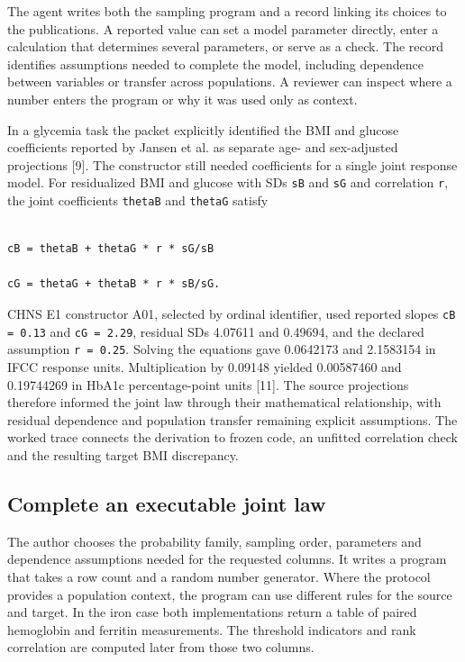 \documentclass[sigconf,review]{acmart}
\begin{document}
The agent writes both the sampling program and a record linking its choices to the publications. A reported value can set a model parameter directly, enter a calculation that determines several parameters, or serve as a check. The record identifies assumptions needed to complete the model, including dependence between variables or transfer across populations. A reviewer can inspect where a number enters the program or why it was used only as context.


In a glycemia task the packet explicitly identified the BMI and glucose coefficients reported by Jansen et al. as separate age- and sex-adjusted projections [9]. The constructor still needed coefficients for a single joint response model. For residualized BMI and glucose with SDs \texttt{sB} and \texttt{sG} and correlation \texttt{r}, the joint coefficients \texttt{thetaB} and \texttt{thetaG} satisfy


\noindent\begin{minipage}{\columnwidth}

\begin{lstlisting}

cB = thetaB + thetaG * r * sG/sB

cG = thetaG + thetaB * r * sB/sG.

\end{lstlisting}

\end{minipage}

CHNS E1 constructor A01, selected by ordinal identifier, used reported slopes \texttt{cB = 0.13} and \texttt{cG = 2.29}, residual SDs 4.07611 and 0.49694, and the declared assumption \texttt{r = 0.25}. Solving the equations gave 0.0642173 and 2.1583154 in IFCC response units. Multiplication by 0.09148 yielded 0.00587460 and 0.19744269 in HbA1c percentage-point units [11]. The source projections therefore informed the joint law through their mathematical relationship, with residual dependence and population transfer remaining explicit assumptions. The worked trace connects the derivation to frozen code, an unfitted correlation check and the resulting target BMI discrepancy.


\subsection{Complete an executable joint law}

The author chooses the probability family, sampling order, parameters and dependence assumptions needed for the requested columns. It writes a program that takes a row count and a random number generator. Where the protocol provides a population context, the program can use different rules for the source and target. In the iron case both implementations return a table of paired hemoglobin and ferritin measurements. The threshold indicators and rank correlation are computed later from those two columns.
\end{document}
